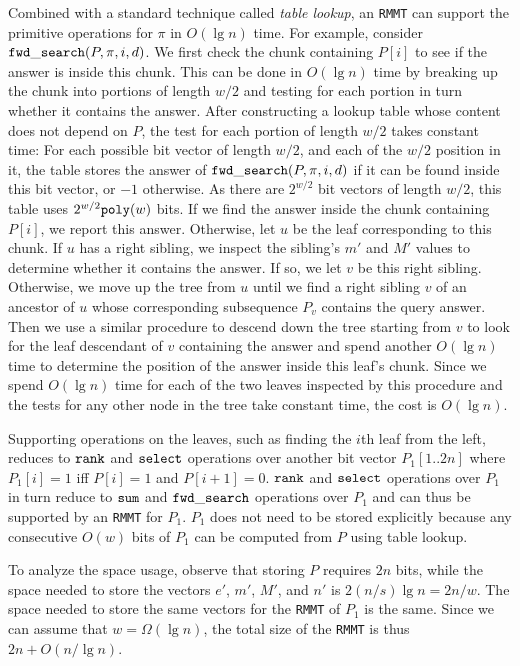 Combined with a standard technique called {\em table lookup}, an {\tt RMMT} can
support the primitive operations
for $\pi$ in $O(\lg n)$ time.  For example, consider
$\mathtt{fwd\_search}(P,\pi,i,d)$.  We first check the chunk containing $P[i]$
to see if the answer is inside this chunk.  This can be done in
$O(\lg n)$ time by breaking up the chunk into portions of length $w/2$
and testing for each portion in turn whether it contains the answer.
After constructing a lookup table whose content does not
depend on $P$, the test for each portion of length $w/2$ takes
constant time: For each possible bit vector of length $w/2$, and each
of the $w/2$ position in it, the table stores the answer
of $\mathtt{fwd\_search}(P,\pi,i,d)$ if it can be found inside this bit vector,
or $-1$ otherwise.  As there are $2^{w/2}$ bit vectors of length
$w/2$, this table uses $2^{w/2}\mathtt{poly}(w)$ bits.  If we find the answer
inside the chunk containing~$P[i]$, we report this answer.
Otherwise, let $u$ be the leaf corresponding to this
chunk.  If $u$ has a right sibling, we inspect the sibling's $m'$ and
$M'$ values to determine whether it contains the answer.  If so, we
let $v$ be this right sibling.  Otherwise, we move up the tree from
$u$ until we find a right sibling $v$ of an ancestor of $u$ whose
corresponding subsequence $P_v$ contains the query answer.  Then we
use a similar procedure to descend down the tree starting from $v$ to
look for the leaf descendant of $v$ containing the answer and spend
another $O(\lg n)$ time to determine the position of the answer
inside this leaf's chunk.  Since we spend $O(\lg n)$ time for each of
the two leaves inspected by this procedure and the tests for any other
node in the tree take constant time, the cost is $O(\lg n)$.

Supporting operations on the leaves, such as finding the $i$th leaf
from the left, reduces to $\mathtt{rank}$ and $\mathtt{select}$ operations over
another bit vector $P_1[1..2n]$ where $P_1[i] = 1$ iff $P[i] = 1$ and
$P[i+1] = 0$.  $\mathtt{rank}$ and $\mathtt{select}$ operations over $P_1$ in turn
reduce to $\mathtt{sum}$ and $\mathtt{fwd\_search}$ operations over $P_1$ and can thus
be supported by an {\tt RMMT} for $P_1$.  $P_1$ does not need to be
stored explicitly because any consecutive $O(w)$ bits of $P_1$ can be
computed from $P$ using table lookup.

To analyze the space usage, observe that storing $P$ requires $2n$
bits, while the space needed to store the vectors $e'$, $m'$, $M'$,
and $n'$ is $2(n/s) \lg n = 2n/w$.  The space needed to store the same
vectors for the {\tt RMMT} of $P_1$ is the same.  Since we can assume
that $w = \Omega(\lg n)$, the total size of the {\tt RMMT} is thus
$2n + O(n / \lg n)$.
